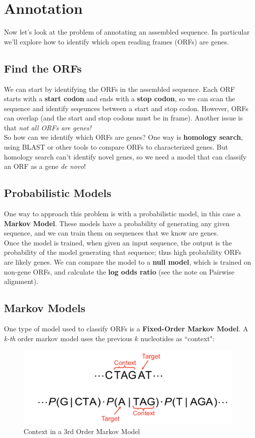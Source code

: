 \documentclass[12pt]{article}
\begin{document}
\section{Annotation}
Now let's look at the problem of annotating an assembled sequence. In particular we'll explore how to identify which open reading frames (ORFs) are genes.
\subsection{Find the ORFs}
We can start by identifying the ORFs in the assembled sequence. Each ORF starts with a \textbf{start codon} and ends with a \textbf{stop codon}, so we can scan the sequence and identify seqeunces between a start and stop codon. However, ORFs can overlap (and the start and stop codons must be in frame). Another issue is that \textit{not all ORFs are genes!} \\[10pt]
So how can we identify which ORFs are genes? One way is \textbf{homology search}, using BLAST or other tools to compare ORFs to characterized genes. But homology search can't identify novel genes, so we need a model that can classify an ORF as a gene \textit{de novo}!

\subsection{Probabilistic Models}
One way to approach this problem is with a probabilistic model, in this case a \textbf{Markov Model}. These models have a probability of generating any given sequence, and we can train them on sequences that we know are genes.\\[10pt]
Once the model is trained, when given an input sequence, the output is the probability of the model generating that sequence; thus high probability ORFs are likely genes. We can compare the model to a \textbf{null model}, which is trained on non-gene ORFs, and calculate the \textbf{log odds ratio} (see the note on Pairwise alignment).

\subsection{Markov Models}
One type of model used to classify ORFs is a \textbf{Fixed-Order Markov Model}. A \textit{k-th} order markov model uses the previous $k$ nucleotides as ``context":
\begin{figure}[h!]
    \centering
    \includegraphics[width=.6\linewidth]{order_hmm.png}
    \caption{Context in a 3rd Order Markov Model}
    \label{fig:order}
\end{figure}
\end{document}
